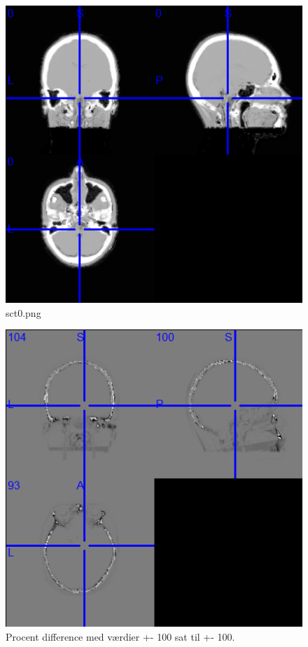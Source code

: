 \begin{figure}
\includegraphics[width=\linewidth]{sct0.png}
\caption{sct0.png}
\end{figure}

\begin{figure}
\includegraphics[width=\linewidth]{pdsct0.png}
\caption{Procent difference med værdier +- 100 sat til +- 100.}
\end{figure}

